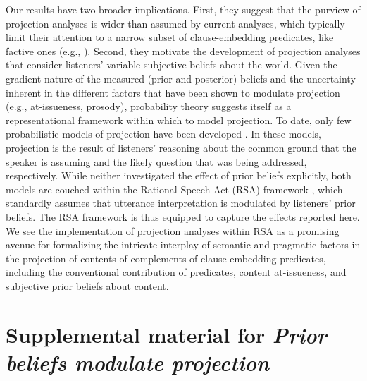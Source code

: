 \documentclass[11pt,fleqn]{article}
\newcommand{\6}{\mbox{$[\hspace*{-.6mm}[$}}
\newcommand{\9}{\mbox{$]\hspace*{-.6mm}]$}}
\begin{document}
Our results have two broader implications. First, they suggest that the purview of projection analyses is wider than assumed by current analyses, which typically limit their attention to a narrow subset of clause-embedding predicates, like factive ones (e.g., ). Second, they motivate the development of projection analyses that consider listeners' variable subjective beliefs about the world. Given the gradient nature of the measured (prior and posterior) beliefs and the uncertainty inherent in the different factors that have been shown to modulate projection (e.g., at-issueness, prosody), probability theory suggests itself as a representational framework within which to model projection. To date, only few probabilistic models of  projection have been developed \cite{qing2016, stevens-etal2017}. In these models, projection is the result of listeners' reasoning about the common ground that the speaker is assuming and the likely question that was being addressed, respectively. While neither investigated the effect of prior beliefs explicitly, both models are couched within the Rational Speech Act (RSA) framework \cite{frankejaeger2016,GoodmanFrank2016}, which standardly assumes that utterance interpretation is modulated by listeners' prior beliefs. The RSA framework is thus equipped to capture the effects reported here. We see the implementation of projection analyses within RSA as a promising avenue for formalizing the intricate interplay of semantic and pragmatic factors in the projection of contents of complements of clause-embedding predicates, including the conventional contribution of predicates, content at-issueness, and subjective prior beliefs about content.





%
%


\newpage

\appendix

\setcounter{table}{0}
\renewcommand{\thetable}{A\arabic{table}}

\setcounter{figure}{0}
\renewcommand{\thefigure}{A\arabic{figure}}

\section*{Supplemental material for {\em Prior beliefs modulate projection}}
\end{document}
